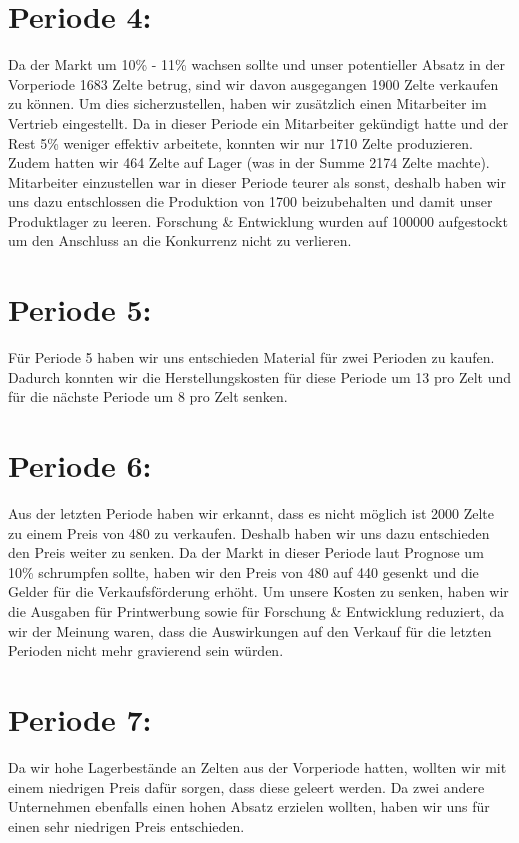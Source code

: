 \documentclass[a4paper, 12pt]{report}
\begin{document}
\begin{flushleft}
\section{Periode 4:}
Da der Markt um 10\% - 11\% wachsen sollte und unser potentieller Absatz in der Vorperiode 1683 Zelte betrug, sind wir davon ausgegangen 1900 Zelte verkaufen zu können.
Um dies sicherzustellen, haben wir zusätzlich einen Mitarbeiter im Vertrieb eingestellt.
Da in dieser Periode ein Mitarbeiter gekündigt hatte und der Rest 5\% weniger effektiv arbeitete, konnten wir nur 1710 Zelte produzieren.
Zudem hatten wir 464 Zelte auf Lager (was in der Summe 2174 Zelte machte).
Mitarbeiter einzustellen war in dieser Periode teurer als sonst,
deshalb haben wir uns dazu entschlossen die Produktion von 1700 beizubehalten und damit unser Produktlager zu leeren.
Forschung \& Entwicklung wurden auf 100000\texteuro{} aufgestockt um den Anschluss an die Konkurrenz nicht zu verlieren.  

\section{Periode 5:}
Für Periode 5 haben wir uns entschieden Material für zwei Perioden zu kaufen.
Dadurch konnten wir die Herstellungskosten für diese Periode um 13\texteuro{} pro Zelt und für die nächste Periode um 8\texteuro{} pro Zelt senken.

\newpage
\section{Periode 6:}
Aus der letzten Periode haben wir erkannt, dass es nicht möglich ist 2000 Zelte zu einem Preis von 480\texteuro{} zu verkaufen.
Deshalb haben wir uns dazu entschieden den Preis weiter zu senken.
Da der Markt in dieser Periode laut Prognose um 10\% schrumpfen sollte, haben wir den Preis von 480\texteuro{} auf 440\texteuro{} gesenkt und die Gelder für die Verkaufsförderung erhöht.
Um unsere Kosten zu senken, haben wir die Ausgaben für Printwerbung sowie für Forschung \& Entwicklung reduziert, da wir der Meinung waren, dass die Auswirkungen auf den Verkauf für die letzten Perioden nicht mehr gravierend sein würden.


\section{Periode 7:}
Da wir hohe Lagerbestände an Zelten aus der Vorperiode hatten, wollten wir mit einem niedrigen Preis dafür sorgen,
dass diese geleert werden.
Da zwei andere Unternehmen ebenfalls einen hohen Absatz erzielen wollten, haben wir uns für einen sehr niedrigen Preis entschieden.



\end{flushleft}
\end{document}
